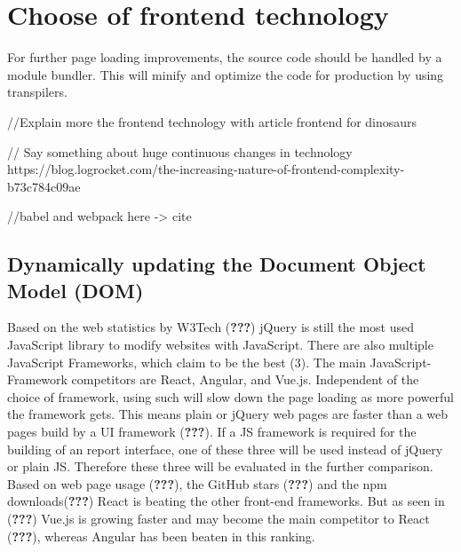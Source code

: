 \documentclass[american,a4paper,oneside,,tablecaptionabove]{scrbook}
\begin{document}
\section{Choose of frontend
technology}\label{choose-of-frontend-technology}

For further page loading improvements, the source code should be handled
by a module bundler. This will minify and optimize the code for
production by using transpilers.

//Explain more the frontend technology with article frontend for
dinosaurs

// Say something about huge continuous changes in technology
https://blog.logrocket.com/the-increasing-nature-of-frontend-complexity-b73c784c09ae

//babel and webpack here -\textgreater{} cite\\

\subsection{Dynamically updating the Document Object Model
(DOM)}\label{dynamically-updating-the-document-object-model-dom}

Based on the web statistics by W3Tech ({\textbf{???}}) jQuery is still
the most used JavaScript library to modify websites with JavaScript.
There are also multiple JavaScript Frameworks, which claim to be the
best (3). The main JavaScript-Framework competitors are React, Angular,
and Vue.js. Independent of the choice of framework, using such will slow
down the page loading as more powerful the framework gets. This means
plain or jQuery web pages are faster than a web pages build by a UI
framework ({\textbf{???}}). If a JS framework is required for the
building of an report interface, one of these three will be used instead
of jQuery or plain JS. Therefore these three will be evaluated in the
further comparison. Based on web page usage ({\textbf{???}}), the GitHub
stars ({\textbf{???}}) and the npm downloads({\textbf{???}}) React is
beating the other front-end frameworks. But as seen in ({\textbf{???}})
Vue.js is growing faster and may become the main competitor to React
({\textbf{???}}), whereas Angular has been beaten in this ranking.
\end{document}
